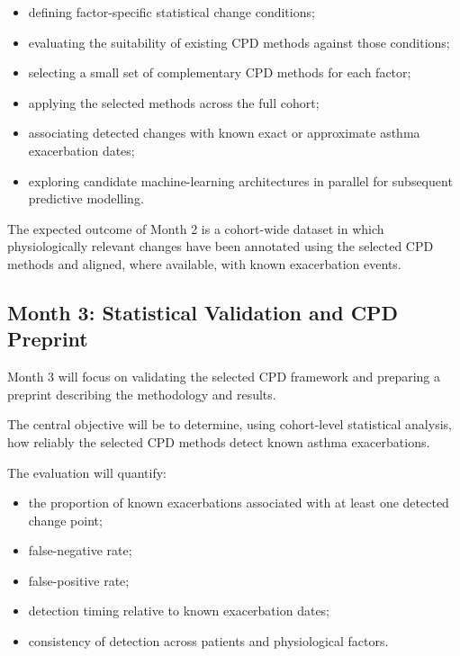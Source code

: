 \documentclass[11pt,a4paper]{article}
\begin{document}
\begin{itemize}[leftmargin=1.5em]
    \item defining factor-specific statistical change conditions;
    \item evaluating the suitability of existing CPD methods against those conditions;
    \item selecting a small set of complementary CPD methods for each factor;
    \item applying the selected methods across the full cohort;
    \item associating detected changes with known exact or approximate asthma exacerbation dates;
    \item exploring candidate machine-learning architectures in parallel for subsequent predictive modelling.
\end{itemize}

The expected outcome of Month 2 is a cohort-wide dataset in which physiologically relevant changes have been annotated using the selected CPD methods and aligned, where available, with known exacerbation events.


\subsection{Month 3: Statistical Validation and CPD Preprint}

Month 3 will focus on validating the selected CPD framework and preparing a preprint describing the methodology and results.

The central objective will be to determine, using cohort-level statistical analysis, how reliably the selected CPD methods detect known asthma exacerbations.

The evaluation will quantify:

\begin{itemize}[leftmargin=1.5em]
    \item the proportion of known exacerbations associated with at least one detected change point;
    \item false-negative rate;
    \item false-positive rate;
    \item detection timing relative to known exacerbation dates;
    \item consistency of detection across patients and physiological factors.
\end{itemize}
\end{document}
